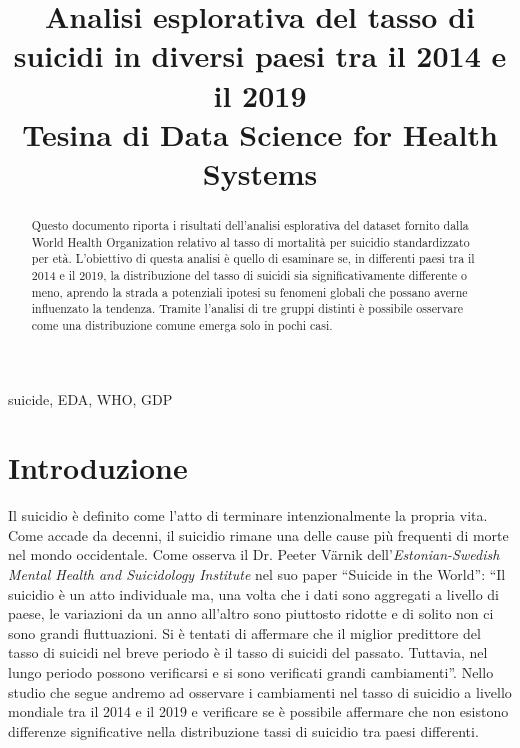 \documentclass[conference]{IEEEtran}
\begin{document}
\title{Analisi esplorativa del tasso di suicidi in diversi paesi tra il 2014 e il 2019\\
{\footnotesize Tesina di Data Science for Health Systems}
}

\author{
}

\maketitle

\begin{abstract}
Questo documento riporta i risultati dell'analisi esplorativa del dataset fornito dalla
World Health Organization relativo al tasso di mortalità per suicidio standardizzato per età.
L'obiettivo di questa analisi è quello di esaminare se, in differenti paesi tra il 2014 e il 2019,
la distribuzione del tasso di suicidi sia significativamente differente o meno,
aprendo la strada a potenziali
ipotesi su fenomeni globali che possano averne influenzato la tendenza.
Tramite l'analisi di tre gruppi distinti è possibile osservare come una
distribuzione comune emerga solo in pochi casi.
\end{abstract}

\begin{IEEEkeywords}
suicide, EDA, WHO, GDP
\end{IEEEkeywords}

\section{Introduzione}
Il suicidio è definito come l'atto di terminare intenzionalmente la propria vita\cite{b1}.
Come accade da decenni, il suicidio rimane una delle cause più
frequenti di morte nel mondo occidentale\cite{b2}.
Come osserva il Dr. Peeter V\"arnik dell'\emph{Estonian-Swedish Mental Health
and Suicidology Institute} nel suo paper ``Suicide in the World''\cite{b3}:
``Il suicidio è un atto individuale ma, una volta che i dati sono aggregati a
livello di paese, le variazioni da un anno all'altro sono piuttosto ridotte e
di solito non ci sono grandi fluttuazioni. Si è tentati di affermare che
il miglior predittore del tasso di suicidi nel breve periodo è il tasso di suicidi del passato.
Tuttavia, nel lungo periodo possono verificarsi e si sono verificati grandi cambiamenti''.
Nello studio che segue andremo ad osservare i cambiamenti nel tasso di suicidio 
a livello mondiale tra il 2014 e il 2019 e verificare se è possibile affermare
che non esistono differenze significative nella distribuzione tassi di suicidio
tra paesi differenti.
\end{document}
